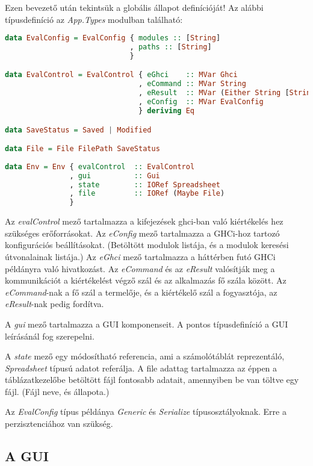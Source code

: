 Ezen bevezető után tekintsük a globális állapot definícióját! Az alábbi típusdefiníció az \textit{App.Types} modulban található:
\begin{lstlisting}[language={Haskell}, label=src:env]
data EvalConfig = EvalConfig { modules :: [String]
                             , paths :: [String]
                             }

data EvalControl = EvalControl { eGhci    :: MVar Ghci
                               , eCommand :: MVar String
                               , eResult  :: MVar (Either String [String])
                               , eConfig  :: MVar EvalConfig 
                               } deriving Eq

data SaveStatus = Saved | Modified

data File = File FilePath SaveStatus
  
data Env = Env { evalControl  :: EvalControl
               , gui          :: Gui
               , state        :: IORef Spreadsheet
               , file         :: IORef (Maybe File)
               }
\end{lstlisting}

Az \textit{evalControl} mező tartalmazza a kifejezések ghci-ban való kiértékelés hez szükséges erőforrásokat. Az \textit{eConfig} mező tartalmazza a GHCi-hoz tartozó konfigurációs beállításokat. (Betöltött modulok listája, és a modulok keresési útvonalainak listája.) Az \textit{eGhci} mező tartalmazza a háttérben futó GHCi példányra való hivatkozást. Az \textit{eCommand} és az \textit{eResult} valósítják meg a kommunikációt a kiértékelést végző szál és az alkalmazás fő szála között. Az \textit{eCommand}-nak a fő szál a termelője, és a kiértékelő szál a fogyasztója, az \textit{eResult}-nak pedig fordítva.

A \textit{gui} mező tartalmazza a GUI komponenseit. A pontos típusdefiníció a GUI leírásánál fog szerepelni.

A \textit{state} mező egy módosítható referencia, ami a számolótáblát reprezentáló, \textit{Spreadsheet} típusú adatot referálja. A file adattag tartalmazza az éppen a táblázatkezelőbe betöltött fájl fontosabb adatait, amennyiben be van töltve egy fájl. (Fájl neve, és állapota.)

Az \textit{EvalConfig} típus példánya \textit{Generic} és \textit{Serialize} típusosztályoknak. Erre a perzisztenciához van szükség.

\subsection{A GUI}

